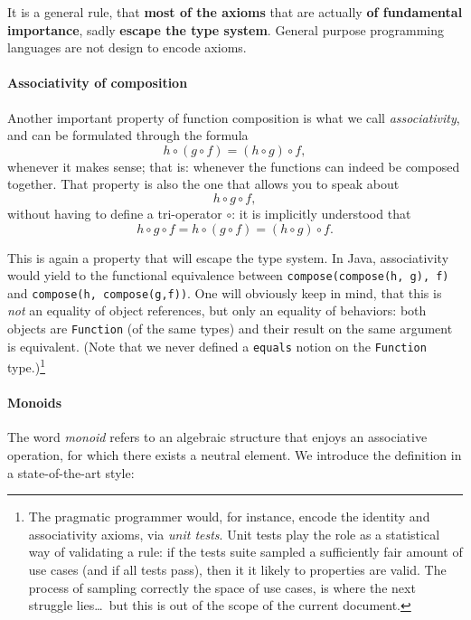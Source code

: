 \documentclass[12pt,a4paper]{report}
\theoremstyle{theorem}
\theoremstyle{definition}
\begin{document}
It is a general rule,
that {\bf most of the axioms} that are actually {\bf of fundamental importance},
sadly {\bf escape the type system}. General purpose programming languages
are not design to encode axioms.

\paragraph*{Associativity of composition}

Another important property of function composition is what we call
\emph{associativity}, and can be formulated through the formula
	\[ h\circ(g\circ f) = (h\circ g)\circ f ,\]
whenever it makes sense; that is: whenever the functions can indeed
be composed together.
That property is also the one that allows you to speak about
	\[ h\circ g\circ f, \]
without having to define a tri-operator $\circ$: it is implicitly understood that
	\[ h\circ g\circ f = h\circ(g\circ f) = (h\circ g)\circ f .\]
	
This is again a property that will
escape the type system.
In Java, associativity would yield to the functional equivalence
between \lstinline{compose(compose(h, g), f)}{}
and \lstinline{compose(h, compose(g,f))}{}.
One will obviously keep in mind, that this is \emph{not} an equality of
object references, but only an equality of behaviors: both
objects are \lstinline{Function}{} (of the same types) and their result
on the same argument is equivalent. (Note that we never defined a
\lstinline{equals}{} notion on the \lstinline{Function}{} type.)\footnote{The
pragmatic programmer would, for instance, encode the identity and associativity
axioms, via \emph{unit tests}. Unit tests play the role as a statistical way
of validating a rule: if the tests suite sampled a sufficiently fair
amount of use cases (and if all tests pass), then it it likely to properties
are valid. The process of sampling correctly the space of use cases,
is where the next struggle lies\ldots\ but
 this is out of the scope of the current
document.}

\paragraph*{Monoids}
The word \emph{monoid} refers to an algebraic structure that enjoys
an associative operation, for which there exists a neutral element.
We introduce the definition in a state-of-the-art style:
\end{document}
